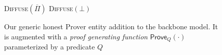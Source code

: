 \begin{figure}[t]
\begin{algorithm}[H]
    \caption{\label{alg.backbone-prover} Our generic honest Prover entity addition to the
        backbone model. It is augmented with a{ \em
        proof generating function} $\textsf{Prove}_Q(\cdot)$ parameterized by a
        predicate $Q$}
    \begin{algorithmic}[1]
     \Statex
     \Let\chain\varepsilon
                \State\textsc{Diffuse}{$(\overline \Pi)$}
            \Else
                \State\textsc{Diffuse}{$(\bot)$}
            \EndIf
        \EndWhile
        \vskip8pt
    \end{algorithmic}
\end{algorithm}
\end{figure}
